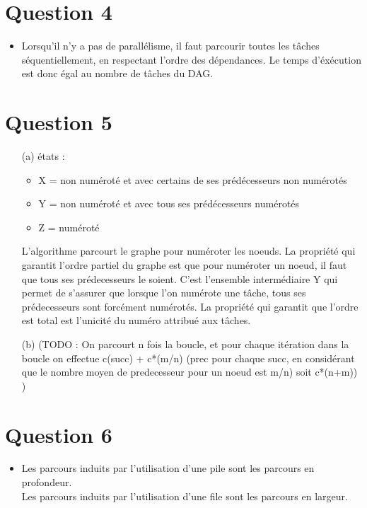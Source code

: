\documentclass{report}
\begin{document}
\section{Question 4}

\begin{itemize}
	\item  Lorsqu'il n'y a pas de parallélisme, il faut parcourir toutes les tâches séquentiellement, en respectant l'ordre des dépendances. Le 	temps d'éxécution est donc égal au nombre de tâches du DAG.
\end{itemize}

\section{Question 5}

\begin{itemize}
	\item[(a)] états :
		\begin{itemize}
			\item X = non numéroté et avec certains de ses prédécesseurs non numérotés 
			\item Y = non numéroté et avec tous ses prédécesseurs numérotés
			\item Z = numéroté
		\end{itemize}		 
	L'algorithme parcourt le graphe pour numéroter les noeuds. La propriété qui garantit l'ordre partiel du graphe est que pour numéroter un noeud, il faut que tous ses prédecesseurs le soient. 
	C'est l'ensemble intermédiaire Y qui permet de s'assurer que lorsque l'on numérote une tâche, tous ses prédecesseurs sont forcément numérotés. 
	La propriété qui garantit que l'ordre est total est l'unicité du numéro attribué aux tâches. 
	
	\item[(b)] (TODO : On parcourt n fois la boucle, et pour chaque itération dans la boucle on effectue c(succ) + c*(m/n) (prec pour chaque succ, en considérant que le nombre moyen de predecesseur pour un noeud est m/n)  soit c*(n+m)) )
	
\end{itemize}

\section{Question 6}

\begin{itemize}
	\item Les parcours induits par l'utilisation d'une pile sont les parcours en profondeur. \\ 
	Les parcours induits par l'utilisation d'une file sont les parcours en largeur.
\end{itemize}
\end{document}

